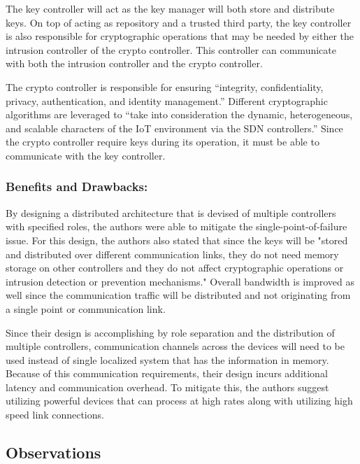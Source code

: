 \smallskip

The key controller will act as the key manager will both store and distribute keys. On top of acting as repository and a trusted third party, the key controller is also responsible for cryptographic operations that may be needed by either the intrusion controller of the crypto controller. This controller can communicate with both the intrusion controller and the crypto controller.

\smallskip

The crypto controller is responsible for ensuring “integrity, confidentiality, privacy, authentication, and identity management.” \cite {kalkan2017securing} Different cryptographic algorithms are leveraged to “take into consideration the dynamic, heterogeneous, and scalable characters of the IoT environment via the SDN controllers.” \cite {kalkan2017securing} Since the crypto controller require keys during its operation, it must be able to communicate with the key controller.

\subsubsection {Benefits and Drawbacks:}
\smallskip
By designing a distributed architecture that is devised of multiple controllers with specified roles, the authors were able to mitigate the single-point-of-failure issue. For this design, the authors also stated that since the keys will be "stored and distributed over different communication links, they do not need memory storage on other controllers and they do not affect cryptographic operations or intrusion detection or prevention mechanisms." \cite {kalkan2017securing} Overall bandwidth is improved as well since the communication traffic will be distributed and not originating from a single point or communication link.

\smallskip

Since their design is accomplishing by role separation and the distribution of multiple controllers, communication channels across the devices will need to be used instead of single localized system that has the information in memory. Because of this communication requirements, their design incurs additional latency and communication overhead. To mitigate this, the authors suggest utilizing powerful devices that can process at high rates along with utilizing high speed link connections. 

\subsection {Observations}
\smallskip

